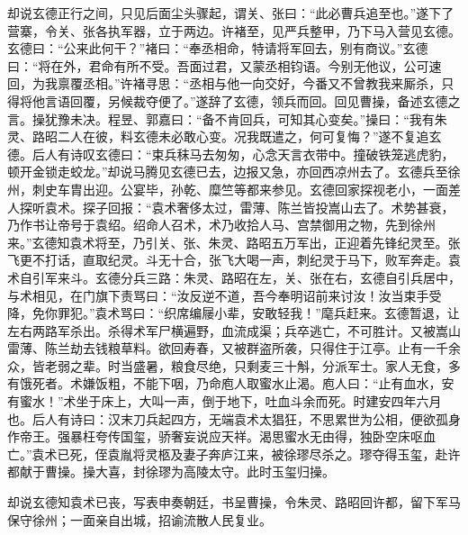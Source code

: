 却说玄德正行之间，只见后面尘头骤起，谓关、张曰：“此必曹兵追至也。”遂下了营寨，令关、张各执军器，立于两边。许褚至，见严兵整甲，乃下马入营见玄德。玄德曰：“公来此何干？”褚曰：“奉丞相命，特请将军回去，别有商议。”玄德曰：“将在外，君命有所不受。吾面过君，又蒙丞相钧语。今别无他议，公可速回，为我禀覆丞相。”许褚寻思：“丞相与他一向交好，今番又不曾教我来厮杀，只得将他言语回覆，另候裁夺便了。”遂辞了玄德，领兵而回。回见曹操，备述玄德之言。操犹豫未决。程昱、郭嘉曰：“备不肯回兵，可知其心变矣。”操曰：“我有朱灵、路昭二人在彼，料玄德未必敢心变。况我既遣之，何可复悔？”遂不复追玄德。后人有诗叹玄德曰：“束兵秣马去匆匆，心念天言衣带中。撞破铁笼逃虎豹，顿开金锁走蛟龙。”却说马腾见玄德已去，边报又急，亦回西凉州去了。玄德兵至徐州，刺史车胄出迎。公宴毕，孙乾、糜竺等都来参见。玄德回家探视老小，一面差人探听袁术。探子回报：“袁术奢侈太过，雷薄、陈兰皆投嵩山去了。术势甚衰，乃作书让帝号于袁绍。绍命人召术，术乃收拾人马、宫禁御用之物，先到徐州来。”玄德知袁术将至，乃引关、张、朱灵、路昭五万军出，正迎着先锋纪灵至。张飞更不打话，直取纪灵。斗无十合，张飞大喝一声，刺纪灵于马下，败军奔走。袁术自引军来斗。玄德分兵三路：朱灵、路昭在左，关、张在右，玄德自引兵居中，与术相见，在门旗下责骂曰：“汝反逆不道，吾今奉明诏前来讨汝！汝当束手受降，免你罪犯。”袁术骂曰：“织席编屦小辈，安敢轻我！”麾兵赶来。玄德暂退，让左右两路军杀出。杀得术军尸横遍野，血流成渠；兵卒逃亡，不可胜计。又被嵩山雷薄、陈兰劫去钱粮草料。欲回寿春，又被群盗所袭，只得住于江亭。止有一千余众，皆老弱之辈。时当盛暑，粮食尽绝，只剩麦三十斛，分派军士。家人无食，多有饿死者。术嫌饭粗，不能下咽，乃命庖人取蜜水止渴。庖人曰：“止有血水，安有蜜水！”术坐于床上，大叫一声，倒于地下，吐血斗余而死。时建安四年六月也。后人有诗曰：汉末刀兵起四方，无端袁术太猖狂，不思累世为公相，便欲孤身作帝王。强暴枉夸传国玺，骄奢妄说应天祥。渴思蜜水无由得，独卧空床呕血亡。”袁术已死，侄袁胤将灵柩及妻子奔庐江来，被徐璆尽杀之。璆夺得玉玺，赴许都献于曹操。操大喜，封徐璆为高陵太守。此时玉玺归操。

却说玄德知袁术已丧，写表申奏朝廷，书呈曹操，令朱灵、路昭回许都，留下军马保守徐州；一面亲自出城，招谕流散人民复业。

